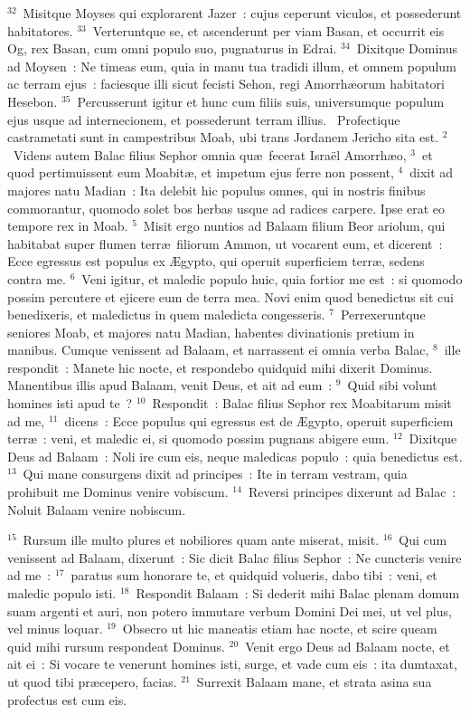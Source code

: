 ${}^{32}$~Misitque Moyses qui explorarent Jazer~: cujus ceperunt viculos, et possederunt habitatores.
${}^{33}$~Verteruntque se, et ascenderunt per viam Basan, et occurrit eis Og, rex Basan, cum omni populo suo, pugnaturus in Edrai.
${}^{34}$~Dixitque Dominus ad Moysen~: Ne timeas eum, quia in manu tua tradidi illum, et omnem populum ac terram ejus~: faciesque illi sicut fecisti Sehon, regi Amorrh\ae orum habitatori Hesebon.
${}^{35}$~Percusserunt igitur et hunc cum filiis suis, universumque populum ejus usque ad internecionem, et possederunt terram illius.
~\lettrine[lines=10,image=true,loversize=0.05,lraise=-0.03]{P}{}rofectique castrametati sunt in campestribus Moab, ubi trans Jordanem Jericho sita est.
${}^{2}$~Videns autem Balac filius Sephor omnia qu\ae\ fecerat Isra\"el Amorrh\ae o,
${}^{3}$~et quod pertimuissent eum Moabit\ae , et impetum ejus ferre non possent,
${}^{4}$~dixit ad majores natu Madian~: Ita delebit hic populus omnes, qui in nostris finibus commorantur, quomodo solet bos herbas usque ad radices carpere. Ipse erat eo tempore rex in Moab.
${}^{5}$~Misit ergo nuntios ad Balaam filium Beor ariolum, qui habitabat super flumen terr\ae\ filiorum Ammon, ut vocarent eum, et dicerent~: Ecce egressus est populus ex \AE gypto, qui operuit superficiem terr\ae , sedens contra me.
${}^{6}$~Veni igitur, et maledic populo huic, quia fortior me est~: si quomodo possim percutere et ejicere eum de terra mea. Novi enim quod benedictus sit cui benedixeris, et maledictus in quem maledicta congesseris.
${}^{7}$~Perrexeruntque seniores Moab, et majores natu Madian, habentes divinationis pretium in manibus. Cumque venissent ad Balaam, et narrassent ei omnia verba Balac,
${}^{8}$~ille respondit~: Manete hic nocte, et respondebo quidquid mihi dixerit Dominus. Manentibus illis apud Balaam, venit Deus, et ait ad eum~:
${}^{9}$~Quid sibi volunt homines isti apud te~?
${}^{10}$~Respondit~: Balac filius Sephor rex Moabitarum misit ad me,
${}^{11}$~dicens~: Ecce populus qui egressus est de \AE gypto, operuit superficiem terr\ae~: veni, et maledic ei, si quomodo possim pugnans abigere eum.
${}^{12}$~Dixitque Deus ad Balaam~: Noli ire cum eis, neque maledicas populo~: quia benedictus est.
${}^{13}$~Qui mane consurgens dixit ad principes~: Ite in terram vestram, quia prohibuit me Dominus venire vobiscum.
${}^{14}$~Reversi principes dixerunt ad Balac~: Noluit Balaam venire nobiscum.


${}^{15}$~Rursum ille multo plures et nobiliores quam ante miserat, misit.
${}^{16}$~Qui cum venissent ad Balaam, dixerunt~: Sic dicit Balac filius Sephor~: Ne cuncteris venire ad me~:
${}^{17}$~paratus sum honorare te, et quidquid volueris, dabo tibi~: veni, et maledic populo isti.
${}^{18}$~Respondit Balaam~: Si dederit mihi Balac plenam domum suam argenti et auri, non potero immutare verbum Domini Dei mei, ut vel plus, vel minus loquar.
${}^{19}$~Obsecro ut hic maneatis etiam hac nocte, et scire queam quid mihi rursum respondeat Dominus.
${}^{20}$~Venit ergo Deus ad Balaam nocte, et ait ei~: Si vocare te venerunt homines isti, surge, et vade cum eis~: ita dumtaxat, ut quod tibi pr\ae cepero, facias.
${}^{21}$~Surrexit Balaam mane, et strata asina sua profectus est cum eis.


